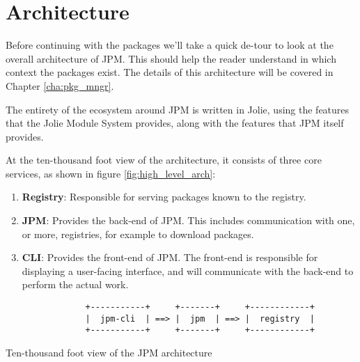 \section{Architecture}


Before continuing with the packages we'll take a quick de-tour to look at the
overall architecture of JPM. This should help the reader understand in which
context the packages exist. The details of this architecture will be covered in
Chapter \ref{cha:pkg_mngr}.

The entirety of the ecosystem around JPM is written in Jolie, using the
features that the Jolie Module System provides, along with the features that
JPM itself provides.

At the ten-thousand foot view of the architecture, it consists of three
core services, as shown in figure \ref{fig:high_level_arch}:

\begin{enumerate}

\item \textbf{Registry}: Responsible for serving packages known to the
registry.

\item \textbf{JPM}: Provides the back-end of JPM. This includes communication
with one, or more, registries, for example to download packages.

\item \textbf{CLI}: Provides the front-end of JPM. The front-end is responsible
for displaying a user-facing interface, and will communicate with the back-end
to perform the actual work.

\end{enumerate}

\begin{listing}[H]
\begin{verbatim}
                +-----------+     +-------+     +------------+
                |  jpm-cli  | ==> |  jpm  | ==> |  registry  |
                +-----------+     +-------+     +------------+
\end{verbatim}
\caption{Ten-thousand foot view of the JPM architecture}
\label{fig:high_level_arch}
\end{listing}

